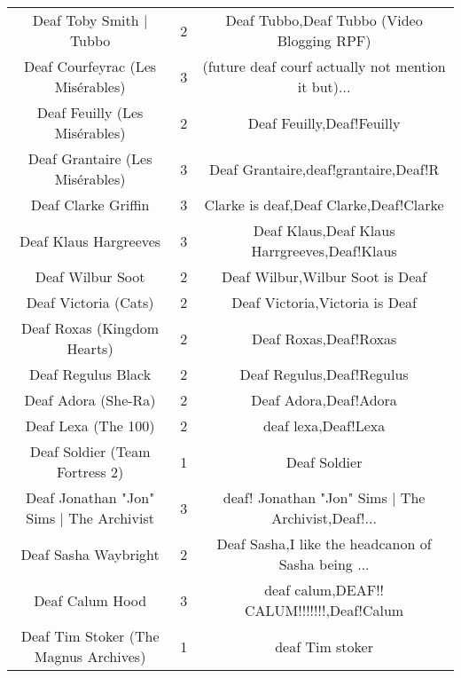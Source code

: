 \begin{table}[h!]
{\begin{tabular}{|c|c|c|}
                           Deaf Toby Smith | Tubbo &      2 &         Deaf Tubbo,Deaf Tubbo (Video Blogging RPF) \\
                  Deaf Courfeyrac (Les Misérables) &      3 & (future deaf courf actually not mention it but)... \\
                     Deaf Feuilly (Les Misérables) &      2 &                          Deaf Feuilly,Deaf!Feuilly \\
                   Deaf Grantaire (Les Misérables) &      3 &               Deaf Grantaire,deaf!grantaire,Deaf!R \\
                               Deaf Clarke Griffin &      3 &             Clarke is deaf,Deaf Clarke,Deaf!Clarke \\
                             Deaf Klaus Hargreeves &      3 &       Deaf Klaus,Deaf Klaus Harrgreeves,Deaf!Klaus \\
                                  Deaf Wilbur Soot &      2 &                    Deaf Wilbur,Wilbur Soot is Deaf \\
                              Deaf Victoria (Cats) &      2 &                     Deaf Victoria,Victoria is Deaf \\
                       Deaf Roxas (Kingdom Hearts) &      2 &                              Deaf Roxas,Deaf!Roxas \\
                                Deaf Regulus Black &      2 &                          Deaf Regulus,Deaf!Regulus \\
                               Deaf Adora (She-Ra) &      2 &                              Deaf Adora,Deaf!Adora \\
                               Deaf Lexa (The 100) &      2 &                                deaf lexa,Deaf!Lexa \\
                    Deaf Soldier (Team Fortress 2) &      1 &                                       Deaf Soldier \\
          Deaf Jonathan "Jon" Sims | The Archivist &      3 & deaf! Jonathan "Jon" Sims | The Archivist,Deaf!... \\
                              Deaf Sasha Waybright &      2 & Deaf Sasha,I like the headcanon of Sasha being ... \\
                                   Deaf Calum Hood &      3 &          deaf calum,DEAF!! CALUM!!!!!!!,Deaf!Calum \\
             Deaf Tim Stoker (The Magnus Archives) &      1 &                                    deaf Tim stoker \\

\end{tabular}}
\end{table}
